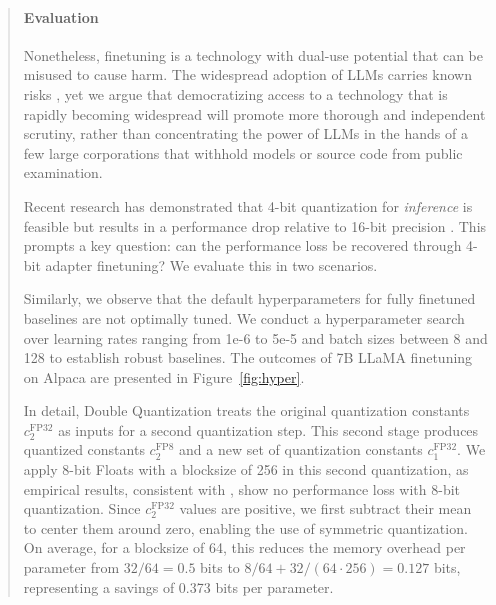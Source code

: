 \begin{quote}
\paragraph{Evaluation}

Nonetheless, finetuning is a technology with dual-use potential that can be misused to cause harm. The widespread adoption of LLMs carries known risks \citep{bommasani2021opportunities,bender2021dangers}, yet we argue that democratizing access to a technology that is rapidly becoming widespread will promote more thorough and independent scrutiny, rather than concentrating the power of LLMs in the hands of a few large corporations that withhold models or source code from public examination.

Recent research has demonstrated that 4-bit quantization for \emph{inference} is feasible but results in a performance drop relative to 16-bit precision \citep{dettmers2022case,frantar2022gptq}. This prompts a key question: can the performance loss be recovered through 4-bit adapter finetuning? We evaluate this in two scenarios.

Similarly, we observe that the default hyperparameters for fully finetuned baselines are not optimally tuned. We conduct a hyperparameter search over learning rates ranging from 1e-6 to 5e-5 and batch sizes between 8 and 128 to establish robust baselines. The outcomes of 7B LLaMA finetuning on Alpaca are presented in Figure~\ref{fig:hyper}.

In detail, Double Quantization treats the original quantization constants $c_2^{\text{FP32}}$ as inputs for a second quantization step. This second stage produces quantized constants $c_2^{\text{FP8}}$ and a new set of quantization constants $c_1^{\text{FP32}}$. We apply 8-bit Floats with a blocksize of 256 in this second quantization, as empirical results, consistent with \citet{dettmers2022case}, show no performance loss with 8-bit quantization. Since $c_2^{\text{FP32}}$ values are positive, we first subtract their mean to center them around zero, enabling the use of symmetric quantization. On average, for a blocksize of 64, this reduces the memory overhead per parameter from $32/64=0.5$ bits to $8/64 + 32/(64 \cdot 256) = 0.127$ bits, representing a savings of 0.373 bits per parameter.


\end{quote}
